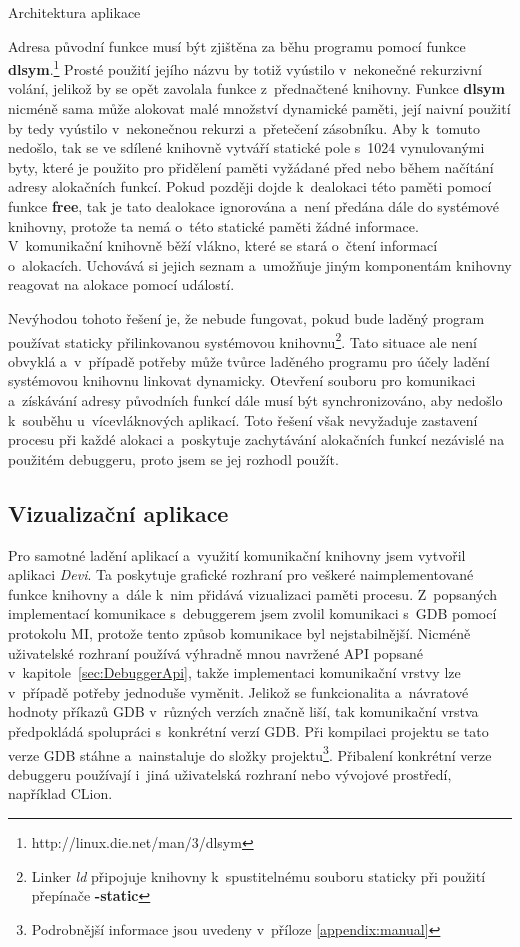 \documentclass[czech,bachelor,male,python,dept460,hidelinks]{diploma}						%
\newcommand{\parspace}[1][]{
	\ifthenelse{\isempty{#1}}{\vspace{0mm}}{\vspace{#1}}
	\par
}
\begin{document}
\begin{section}{Architektura aplikace}
				\parspace Adresa původní funkce musí být zjištěna za běhu programu pomocí
				funkce \textbf{dlsym}.\footnote{http://linux.die.net/man/3/dlsym} Prosté použití jejího názvu by totiž vyústilo v~nekonečné rekurzivní volání, jelikož
				by se opět zavolala funkce z~přednačtené knihovny. Funkce \textbf{dlsym} nicméně sama může alokovat malé množství dynamické paměti,
				její naivní použití by tedy vyústilo v~nekonečnou rekurzi a~přetečení zásobníku.
				Aby k~tomuto nedošlo, tak se ve sdílené knihovně vytváří statické pole s~1024 vynulovanými
				byty, které je použito pro přidělení paměti vyžádané před nebo během načítání adresy alokačních funkcí. Pokud později dojde k~dealokaci této
				paměti pomocí funkce \textbf{free}, tak je tato dealokace ignorována a~není předána dále do systémové knihovny, protože ta nemá o~této statické paměti
				žádné informace. V~komunikační knihovně běží vlákno, které se stará o~čtení informací o~alokacích. Uchovává si jejich seznam
				a~umožňuje jiným komponentám knihovny reagovat na alokace pomocí událostí.
				
				\parspace Nevýhodou tohoto řešení je, že nebude fungovat, pokud bude laděný program používat staticky přilinkovanou systémovou
				knihovnu\footnote{Linker \textit{ld} připojuje knihovny k~spustitelnému souboru staticky při použití přepínače \textbf{-static}}.
				Tato situace ale není obvyklá a~v~případě potřeby může tvůrce laděného programu pro účely ladění systémovou knihovnu linkovat dynamicky.
				Otevření souboru pro komunikaci a~získávání adresy původních funkcí dále musí být synchronizováno, aby nedošlo k~souběhu u~vícevláknových aplikací.
				Toto řešení však nevyžaduje zastavení procesu při každé alokaci a~poskytuje zachytávání alokačních funkcí nezávislé na použitém debuggeru, proto
				jsem se jej rozhodl použít.
			
\section{Vizualizační aplikace}
\label{sec:DeviGuiImplementation}
	Pro samotné ladění aplikací a~využití komunikační knihovny jsem vytvořil aplikaci \textit{Devi}.
	Ta poskytuje grafické rozhraní pro veškeré naimplementované funkce knihovny a~dále k~nim přidává vizualizaci paměti procesu.
	Z~popsaných implementací komunikace s~debuggerem jsem zvolil komunikaci s~GDB pomocí protokolu MI, protože tento způsob komunikace byl nejstabilnější.
	Nicméně uživatelské rozhraní používá výhradně mnou navržené API popsané \mbox{v~kapitole \ref{sec:DebuggerApi}}, takže implementaci komunikační vrstvy
	lze v~případě potřeby jednoduše vyměnit. Jelikož se funkcionalita a~návratové hodnoty příkazů GDB v~různých verzích značně liší, tak komunikační vrstva
	předpokládá spolupráci s~konkrétní verzí GDB. Při kompilaci projektu se tato verze GDB stáhne a~nainstaluje do složky
	projektu\footnote{Podrobnější informace jsou uvedeny v~příloze \ref{appendix:manual}}. Přibalení konkrétní verze debuggeru používají i~jiná uživatelská
	rozhraní nebo vývojové prostředí, například CLion.
	

\end{section}
\end{document}
